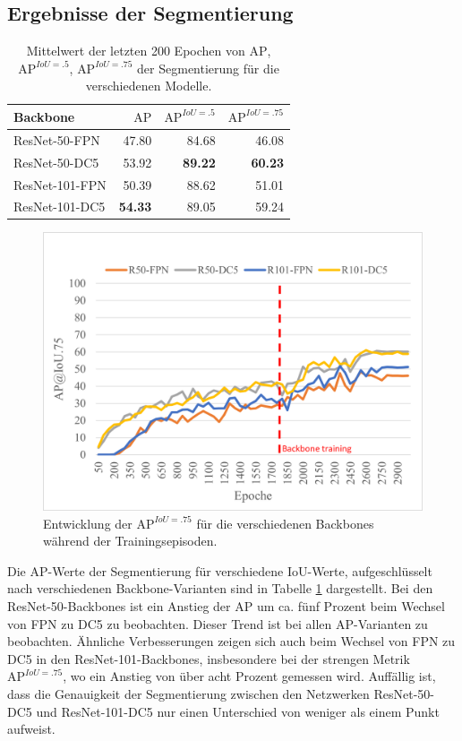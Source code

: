 \subsection{Ergebnisse der Segmentierung}
\begin{table}[htbp]
\centering
\begin{tabular}{lrrr}
\toprule
Backbone & $\text{AP}$ & $\text{AP}^{IoU=.5}$ & $\text{AP}^{IoU=.75}$\\
\midrule
ResNet-50-FPN & 47.80 & 84.68 & 46.08 \\
ResNet-50-DC5 & 53.92 & \textbf{89.22} & \textbf{60.23}\\
ResNet-101-FPN & 50.39 & 88.62 & 51.01\\
ResNet-101-DC5 & \textbf{54.33} & 89.05 & 59.24\\
\bottomrule
\end{tabular}
\caption{Mittelwert der letzten 200 Epochen von $\text{AP}$, $\text{AP}^{IoU=.5}$, $\text{AP}^{IoU=.75}$ der Segmentierung für die verschiedenen Modelle.}
\label{tab:segap75}
\end{table}
\begin{figure}[h]
    \centering
    \includegraphics[trim={.3cm .25cm .2cm 1cm}, clip]{img/eval/segap75.png}
    \caption{Entwicklung der $\text{AP}^{IoU=.75}$ für die verschiedenen Backbones während der Trainingsepisoden.}
    \label{fig:segap75}
\end{figure}
Die AP-Werte der Segmentierung für verschiedene IoU-Werte, aufgeschlüsselt nach verschiedenen Backbone-Varianten sind in Tabelle \ref{tab:segap75} dargestellt. Bei den ResNet-50-Backbones ist ein Anstieg der AP um ca. fünf Prozent beim Wechsel von FPN zu DC5 zu beobachten. Dieser Trend ist bei allen AP-Varianten zu beobachten. Ähnliche Verbesserungen zeigen sich auch beim Wechsel von FPN zu DC5 in den ResNet-101-Backbones, insbesondere bei der strengen Metrik $\text{AP}^{IoU=.75}$, wo ein Anstieg von über acht Prozent gemessen wird. Auffällig ist, dass die Genauigkeit der Segmentierung zwischen den Netzwerken ResNet-50-DC5 und ResNet-101-DC5 nur einen Unterschied von weniger als einem Punkt aufweist.

